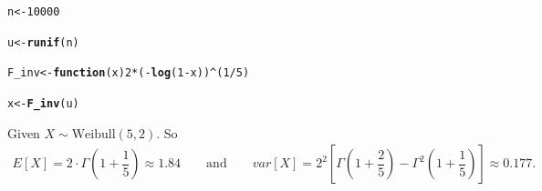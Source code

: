 \documentclass[11pt, a4paper]{article}\usepackage[]{graphicx}\usepackage[]{xcolor}
\makeatletter
\newcommand{\hlnum}[1]{\textcolor[rgb]{0.686,0.059,0.569}{#1}}%
\newcommand{\hlopt}[1]{\textcolor[rgb]{0,0,0}{#1}}%
\newcommand{\hldef}[1]{\textcolor[rgb]{0.345,0.345,0.345}{#1}}%
\newcommand{\hlkwa}[1]{\textcolor[rgb]{0.161,0.373,0.58}{\textbf{#1}}}%
\newcommand{\hlkwb}[1]{\textcolor[rgb]{0.69,0.353,0.396}{#1}}%
\newcommand{\hlkwc}[1]{\textcolor[rgb]{0.333,0.667,0.333}{#1}}%
\newcommand{\hlkwd}[1]{\textcolor[rgb]{0.737,0.353,0.396}{\textbf{#1}}}%
\newenvironment{kframe}{%
 \def\at@end@of@kframe{}%
 \ifinner\ifhmode%
  \def\at@end@of@kframe{\end{minipage}}%
  \begin{minipage}{\columnwidth}%
 \fi\fi%
 \def\FrameCommand##1{\hskip\@totalleftmargin \hskip-\fboxsep
 \colorbox{shadecolor}{##1}\hskip-\fboxsep
     \hskip-\linewidth \hskip-\@totalleftmargin \hskip\columnwidth}%
 \MakeFramed {\advance\hsize-\width
   \@totalleftmargin\z@ \linewidth\hsize
   \@setminipage}}%
 {\par\unskip\endMakeFramed%
 \at@end@of@kframe}
\newenvironment{knitrout}{}{} %
\makeatother
\begin{document}
\begin{knitrout}
\color{fgcolor}\begin{kframe}
\begin{alltt}
\hldef{n} \hlkwb{<-} \hlnum{10000}
\end{alltt}
\end{kframe}
\end{knitrout}

\begin{knitrout}
\color{fgcolor}\begin{kframe}
\begin{alltt}
\hldef{u} \hlkwb{<-} \hlkwd{runif}\hldef{(n)}
\end{alltt}
\end{kframe}
\end{knitrout}

\begin{knitrout}
\color{fgcolor}\begin{kframe}
\begin{alltt}
\hldef{F_inv} \hlkwb{<-} \hlkwa{function}\hldef{(}\hlkwc{x}\hldef{)} \hlnum{2} \hlopt{*} \hldef{(}\hlopt{-}\hlkwd{log}\hldef{(}\hlnum{1} \hlopt{-} \hldef{x))}\hlopt{^}\hldef{(}\hlnum{1}\hlopt{/}\hlnum{5}\hldef{)}
\end{alltt}
\end{kframe}
\end{knitrout}

\begin{knitrout}
\color{fgcolor}\begin{kframe}
\begin{alltt}
\hldef{x} \hlkwb{<-} \hlkwd{F_inv}\hldef{(u)}
\end{alltt}
\end{kframe}
\end{knitrout}

\vspace{1cm}

 \hspace{0.2cm} Given $X \sim \text{Weibull}(5, 2)$. So
\begin{align*}
E[X] = 2 \cdot \Gamma \left( 1 + \dfrac{1}{5} \right) \approx 1.84  \qquad \text{and} \qquad var[X] = 2^2 \left[ \Gamma \left( 1 + \dfrac{2}{5} \right) - \Gamma^2 \left( 1 + \dfrac{1}{5} \right) \right] \approx 0.177.
\end{align*}
\end{document}
